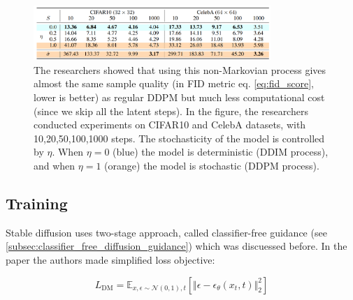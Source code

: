 \begin{figure}
    \centering
    \includegraphics[width=0.8\textwidth]{images/diffusion_models/stable_diffusion/ddim_sample_quality.png}
    \caption{The researchers showed that using this non-Markovian process gives almost the same sample quality (in FID metric eq. \ref{eq:fid_score}, lower is better) as regular DDPM but much less computational cost (since we skip all the latent steps). In the figure, the researchers conducted experiments on CIFAR10 and CelebA datasets, with 10,20,50,100,1000 steps. The stochasticity of the model is controlled by $\eta$. When $\eta = 0$ (blue) the model is deterministic (DDIM process), and when $\eta = 1$ (orange) the model is stochastic (DDPM process).}
\end{figure}











\subsection{Training}

Stable diffusion uses two-stage approach, called classifier-free guidance (see \ref{subsec:classifier_free_diffusion_guidance}) which was discuessed before. In the paper the authors made simplified loss objective:

\[
    L_{\text{DM}} = \mathbb{E}_{x, \epsilon \sim \mathcal{N} (0, 1), t} [ \Vert \epsilon - \epsilon_\theta(x_t, t) \Vert _2^2 ]
\]